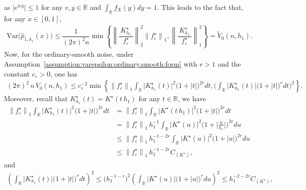 \documentclass[11pt,a4paper,openany]{article}
\newcommand{\Var}{\mbox{Var}}
\def\R{\mathbb{R}}
\begin{document}
as $\big| e^{\mathrm{i} vy}  \big| \leq 1$ for any $v, y \in \R$ and $\int_{\R} f_{X}(y)dy = 1$. This leads to the fact that, for any $x \in [0 , 1]$,  
\begin{align*}
	\Var \big(  \widehat{p}_{1,h_{1}}(x) \big)   \leq  \dfrac{1}{(2\pi)^{2} n} \min  \left\{   \left\| \dfrac{ \,   K_{h_{1}}^{\star} \,  }{ f_{\varepsilon}^{\star} }   \right\|_{2}^{2}  \left\| f_{\varepsilon}^{\star} \right\|_{1}, \left\|  \dfrac{ \,   K_{h_{1}}^{\star} \,  }{f_{\varepsilon}^{\star}}    \right\|_{1}^{2}    \right\} =  \widetilde V_0(n,h_{1}) .   
\end{align*}  
 Now, for the ordinary-smooth noise, under Assumption~\eqref{assumption:varepsilon:ordinary.smooth:form} with $r > 1$ and the constant $c_{\varepsilon} > 0$, one has 
\begin{align*}
(2\pi)^{2} \,  n \,   V_{0}(n,h_{1})  \leq  c_{\varepsilon}^{-2} \min \left\{  \left\| f_{\varepsilon}^{\star} \right\|_{1}  \int_{\R} \big| K_{h_{1}}^{\star}(t) \big|^{2} \big( 1 + |t|  \big)^{2r} dt,      
\Big( \int_{\R} \big|  K_{h_{1}}^{\star}(t) \big|  \big( 1 + |t|  \big)^{r} dt   \Big)^{2}   
\right\}  .   
\end{align*}
Moreover, recall that $K^{\star}_{h_{1}}(t) = K^{\star}(t \, h_{1})$ for any $t \in \R$,  we have
\begin{align*}
	\left\| f_{\varepsilon}^{\star} \right\|_{1}  \int_{\R} \big|  K_{h_{1}}^{\star}(t) \big|^{2} \big( 1 + |t|  \big)^{2r} dt  &=   	\left\| f_{\varepsilon}^{\star} \right\|_{1}  \int_{\R} \big|  K^{\star}(t \, h_{1}) \big|^{2} \big( 1 + |t|  \big)^{2r} dt
	\\
	&=    \left\| f_{\varepsilon}^{\star} \right\|_{1}  \,  h_{1}^{-1}  \int_{\R} \big| K^{\star}(u) \big|^{2} \Big( 1 + \Big| \frac{u}{h_{1}} \Big|  \Big)^{2r} du
	\\[0.2cm]  
	&\leq    %
	\left\| f_{\varepsilon}^{\star} \right\|_{1}  \,  h_{1}^{-1-2r}  \int_{\R} \big| K^{\star}(u) \big|^{2} \big( 1 + | u |  \big)^{2r} du  
	\\
	&\leq  %
	\left\| f_{\varepsilon}^{\star} \right\|_{1}  \,  h_{1}^{-1-2r} C_{(K^{\star})} ,
\end{align*}
and 
\begin{align*}
	\left( \int_{\R} \big|  K_{h_{1}}^{\star}(t) \big|  \big( 1 + |t|  \big)^{r} dt  \right)^{2}  \leq     %
	\Big( h_{1}^{-1-r} \Big)^{2}  \left(  \int_{\R} \big| K^{\star}(u) \big| \big( 1 + | u |  \big)^{r} du  \right)^{2}  \leq  %
	h_{1}^{-2-2r} C_{(K^{\star})} ,   
\end{align*}
\end{document}
